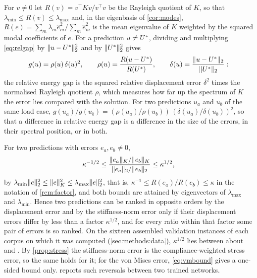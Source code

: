 \begin{remark}\label{rem:factor}
For $v\neq0$ let $R(v)=v^{\top}Kv/v^{\top}v$ be the Rayleigh quotient of $K$, so that
$\lambda_{\min}\le R(v)\le\lambda_{\max}$ and, in the eigenbasis of \cref{cor:modes},
$R(e)=\sum_m\lambda_m\hat e_m^2/\sum_m\hat e_m^2$ is the mean eigenvalue of $K$ weighted by
the squared modal coefficients of $e$. For a prediction $u\neq U^{\ast}$, dividing and
multiplying \eqref{eq:relgap} by $\lVert u-U^{\ast}\rVert_2^2$ and by $\lVert U^{\ast}\rVert_2^2$ gives
\begin{equation}
g(u)=\rho(u)\,\delta(u)^{2},
\qquad
\rho(u)=\frac{R(u-U^{\ast})}{R(U^{\ast})},
\qquad
\delta(u)=\frac{\lVert u-U^{\ast}\rVert_2}{\lVert U^{\ast}\rVert_2}:
\label{eq:factor}
\end{equation}
the relative energy gap is the squared relative displacement error $\delta^2$ times the
normalised Rayleigh quotient $\rho$, which measures how far up the spectrum of $K$ the error
lies compared with the solution. For two predictions $u_a$ and $u_b$ of the same load case,
$g(u_a)/g(u_b)=(\rho(u_a)/\rho(u_b))\,(\delta(u_a)/\delta(u_b))^2$, so that a difference
in relative energy gap is a difference in the size of the errors, in their spectral
position,
or in both.
\end{remark}

\begin{remark}\label{rem:rank}
For two predictions with errors $e_a,e_b\neq0$,
\begin{equation}
\kappa^{-1/2} \le \frac{\lVert e_a\rVert_K/\lVert e_b\rVert_K}{\lVert e_a\rVert_2/\lVert e_b\rVert_2} \le \kappa^{1/2},
\label{eq:rank}
\end{equation}
by $\lambda_{\min}\lVert e\rVert_2^2\le\lVert e\rVert_K^2\le\lambda_{\max}\lVert e\rVert_2^2$, that is,
$\kappa^{-1}\le R(e_a)/R(e_b)\le\kappa$ in the notation of \cref{rem:factor}, and both bounds
are attained by eigenvectors of $\lambda_{\max}$ and $\lambda_{\min}$. Hence two
predictions can be ranked in opposite orders by the displacement error and by the
stiffness-norm error only if their displacement errors differ by less than a factor
$\kappa^{1/2}$, and for every ratio within that factor some pair of errors is so ranked. On
the sixteen assembled validation instances of each corpus on which it was computed
(\cref{sec:methods:data}), $\kappa^{1/2}$ lies between about \numSqrtKappaMin{} and
\numSqrtKappaMax{}. By \cref{prop:stress} the stiffness-norm
error is the compliance-weighted stress error, so the same holds for it; for the von Mises
error, \eqref{eq:vmbound} gives a one-sided bound only. 
reports such reversals between two trained networks.
\end{remark}

